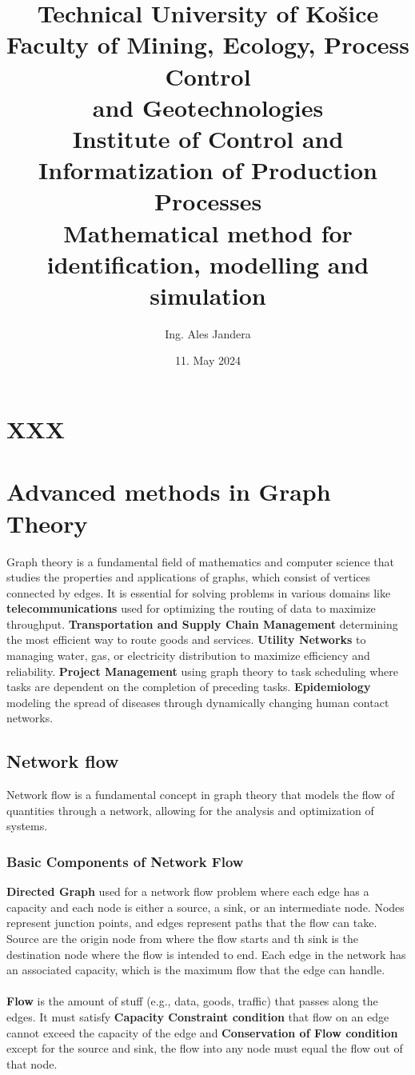 \documentclass[12pt]{article}
\title{
{\textbf{Technical University of Košice}}\\
\vspace{12pt}
{\large \textbf{Faculty of Mining, Ecology, Process Control\\ and Geotechnologies}}\\
\vspace{12pt}
{\large Institute of Control and Informatization of Production Processes}\\
\vspace{64pt}
{\textbf{Mathematical method for identification, modelling and simulation}}\\
}
\author{Ing. Ales Jandera}
\date{11. May 2024}
\begin{document}
\maketitle

\newpage

\tableofcontents

\newpage

\section{XXX}
%
%
\section{Advanced methods in Graph Theory}
%
    Graph theory is a fundamental field of mathematics and computer science that
    studies the properties and applications of graphs, which consist of vertices
    connected by edges. It is essential for solving problems in various domains like
    \textbf{telecommunications} used for optimizing the routing of data to maximize
    throughput. \textbf{Transportation and Supply Chain Management} determining the
    most efficient way to route goods and services. \textbf{Utility Networks} to
    managing water, gas, or electricity distribution to maximize efficiency and
    reliability. \textbf{Project Management} using graph theory to task scheduling
    where tasks are dependent on the completion of preceding tasks.
    \textbf{Epidemiology} modeling the spread of diseases through dynamically
    changing human contact networks.
%
    \subsection{Network flow}
    Network flow is a fundamental concept in graph theory that models the
    flow of quantities through a network, allowing for the analysis and
    optimization of systems.

    \subsubsection{Basic Components of Network Flow}

    \textbf{Directed Graph} used for a network flow problem where each edge has
    a capacity and each node is either a source, a sink, or an intermediate node.
    Nodes represent junction points, and edges represent paths that the flow can take.
    Source are the origin node from where the flow starts and th sink is the
    destination node where the flow is intended to end. Each edge in the network has
    an associated capacity, which is the maximum flow that the edge can handle.\\
    \\
    \textbf{Flow} is the amount of stuff (e.g., data, goods, traffic) that passes along the edges.
    It must satisfy \textbf{Capacity Constraint condition} that flow on an edge cannot
    exceed the capacity of the edge and 
    \textbf{Conservation of Flow condition} except for the source and sink, the flow
    into any node must equal the flow out of that node.
\end{document}
